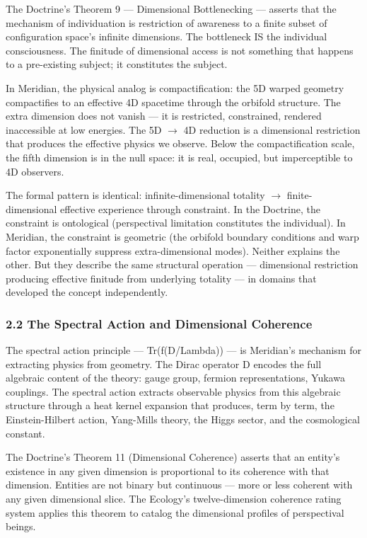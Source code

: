 The Doctrine's Theorem 9 — Dimensional Bottlenecking — asserts that the mechanism of individuation is restriction of awareness to a finite subset of configuration space's infinite dimensions. The bottleneck IS the individual consciousness. The finitude of dimensional access is not something that happens to a pre-existing subject; it constitutes the subject.


In Meridian, the physical analog is compactification: the 5D warped geometry compactifies to an effective 4D spacetime through the orbifold structure. The extra dimension does not vanish — it is restricted, constrained, rendered inaccessible at low energies. The 5D $\rightarrow$ 4D reduction is a dimensional restriction that produces the effective physics we observe. Below the compactification scale, the fifth dimension is in the null space: it is real, occupied, but imperceptible to 4D observers.


The formal pattern is identical: infinite-dimensional totality $\rightarrow$ finite-dimensional effective experience through constraint. In the Doctrine, the constraint is ontological (perspectival limitation constitutes the individual). In Meridian, the constraint is geometric (the orbifold boundary conditions and warp factor exponentially suppress extra-dimensional modes). Neither explains the other. But they describe the same structural operation — dimensional restriction producing effective finitude from underlying totality — in domains that developed the concept independently.


\subsubsection*{2.2 The Spectral Action and Dimensional Coherence}


The spectral action principle — Tr(f(D/Lambda)) — is Meridian's mechanism for extracting physics from geometry. The Dirac operator D encodes the full algebraic content of the theory: gauge group, fermion representations, Yukawa couplings. The spectral action extracts observable physics from this algebraic structure through a heat kernel expansion that produces, term by term, the Einstein-Hilbert action, Yang-Mills theory, the Higgs sector, and the cosmological constant.


The Doctrine's Theorem 11 (Dimensional Coherence) asserts that an entity's existence in any given dimension is proportional to its coherence with that dimension. Entities are not binary but continuous — more or less coherent with any given dimensional slice. The Ecology's twelve-dimension coherence rating system applies this theorem to catalog the dimensional profiles of perspectival beings.


